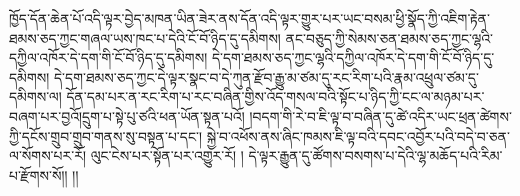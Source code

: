 ཁྱོད་དོན་ཆེན་པོ་འདི་ལྟར་བྱེད་མཁན་ཡིན་ཟེར་ནས་དོན་འདི་ལྟར་གྱུར་པར་ཡང་བསམ་ཕྱི་སྣོད་ཀྱི་འཇིག་རྟེན་ཐམས་ཅད་ཀྱང་གཞལ་ཡས་ཁང་པ་དེའི་ངོ་བོ་ཉིད་དུ་དམིགས། ནང་བཅུད་ཀྱི་སེམས་ཅན་ཐམས་ཅད་ཀྱང་ལྷའི་དཀྱིལ་འཁོར་དེ་དག་གི་ངོ་བོ་ཉིད་དུ་དམིགས། དེ་དག་ཐམས་ཅད་ཀྱང་ལྷའི་དཀྱིལ་འཁོར་དེ་དག་གི་ངོ་བོ་ཉིད་དུ་དམིགས། དེ་དག་ཐམས་ཅད་ཀྱང་དེ་ལྟར་སྣང་བ་དེ་ཀུན་རྫོབ་རྒྱུ་མ་ཙམ་དུ་རང་རིག་པའི་རྣམ་འཕྲུལ་ཙམ་དུ་དམིགས་ལ། དོན་དམ་པར་ན་རང་རིག་པ་རང་བཞིན་གྱིས་འོད་གསལ་བའི་སྟོང་པ་ཉིད་ཀྱི་ངང་ལ་མཉམ་པར་བཞག་པར་བྱའོ།དྲུག་པ་སྟེ་པུ་ཙའི་ཕན་ཡོན་སྟན་པའོ། །བདག་གི་རེ་བ་ཇི་ལྟ་བ་བཞིན་དུ་ཚེ་འདིར་ཡང་ཕྲན་ཚེགས་ཀྱི་དངོས་གྲུབ་གྲུབ་གནས་སུ་བསྟན་པ་དང་། སྐྱེ་བ་འཕོས་ནས་ཞིང་ཁམས་ཇི་ལྟ་བའི་དབང་འབྱོར་པའི་བདེ་བ་ཅན་ལ་སོགས་པར་རོ། ལུང་ངེས་པར་སྟོན་པར་འགྱུར་རོ། ། དེ་ལྟར་རྒྱུན་དུ་ཚོགས་བསགས་པ་དེའི་ལྷ་མཆོད་པའི་རིམ་པ་རྫོགས་སོ།། །།